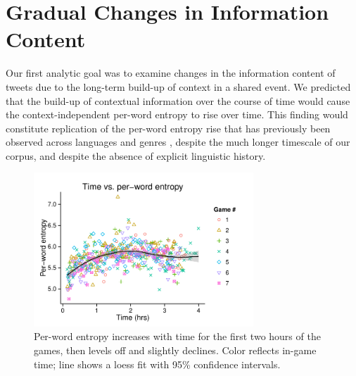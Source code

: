 \documentclass[11pt,letterpaper]{article}
\begin{document}
\section{Gradual Changes in Information Content}

Our first analytic goal was to examine changes in the information content of tweets due to the long-term build-up of context in a shared event.  We predicted that the build-up of contextual information over the course of time would cause the context-independent per-word entropy to rise over time. This finding would constitute replication of the per-word entropy rise that has previously been observed across languages and genres \cite{genzel2002,genzel2003,qian2012}, despite the much longer timescale of our corpus, and despite the absence of explicit linguistic history.

\begin{figure}
 \centering
  \includegraphics[width=3.25in]{figures/fig1.pdf}
 \caption{Per-word entropy increases with time for the first two hours of the games, then levels off and slightly declines. Color reflects in-game time; line shows a loess fit with 95\% confidence intervals.}\label{fig:time-perword-ent}\vspace*{-.5em}
\end{figure}
\end{document}
